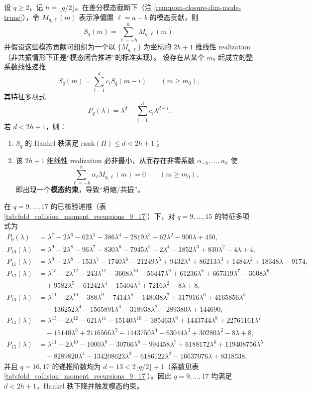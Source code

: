 \begin{theorem}\label{thm:pom-moment-resonance}
设 \(q\ge 2\)，记 \(h=\lfloor q/2\rfloor\)。在差分模态截断下（注 \ref{rem:pom-closure-dim-mode-trunc}），令 \(M_{q,\ell}(m)\) 表示净偏置 \(\ell=a-b\) 的模态贡献，则
$$
S_q(m)=\sum_{\ell=-h}^{h} M_{q,\ell}(m).
$$
并假设这些模态贡献可组织为一个以 \(\{M_{q,\ell}\}\) 为坐标的 \(2h+1\) 维线性 realization（非共振情形下正是“模态闭合推进”的标准实现）。
设存在从某个 \(m_0\) 起成立的整系数线性递推
$$
S_q(m)=\sum_{i=1}^{d} c_i S_q(m-i)\qquad(m\ge m_0),
$$
其特征多项式
$$
P_q(\lambda)=\lambda^d-\sum_{i=1}^d c_i\lambda^{d-i}.
$$
若 \(d<2h+1\)，则：
\begin{enumerate}
  \item \(S_q\) 的 Hankel 秩满足 \(\mathrm{rank}(H)\le d<2h+1\)；
  \item 该 \(2h+1\) 维线性 realization 必非最小，从而存在非零系数 \(\alpha_{-h},\dots,\alpha_h\) 使
  $$
  \sum_{\ell=-h}^{h}\alpha_\ell M_{q,\ell}(m)=0\qquad(m\ge m_0),
  $$
  即出现一个\textbf{模态约束}，导致“坍缩/共振”。
\end{enumerate}
在 \(q=9,\dots,17\) 的已核验递推（表 \ref{tab:fold_collision_moment_recursions_9_17}）下，对 \(q=9,\dots,15\) 的特征多项式为
$$
\begin{aligned}
P_9(\lambda)&=\lambda^7-2\lambda^6-62\lambda^5-386\lambda^4-2819\lambda^3-62\lambda^2-900\lambda+450,\\
P_{10}(\lambda)&=\lambda^9-2\lambda^8-96\lambda^7-830\lambda^6-7945\lambda^5-2\lambda^4-1852\lambda^3+830\lambda^2-4\lambda+4,\\
P_{11}(\lambda)&=\lambda^9-2\lambda^8-153\lambda^7-1740\lambda^6-21249\lambda^5+9432\lambda^4+86213\lambda^3+1484\lambda^2+18348\lambda-9174,
\\
P_{12}(\lambda)&=\lambda^{13}-2\lambda^{12}-243\lambda^{11}-3608\lambda^{10}-56447\lambda^9+61236\lambda^8+667319\lambda^7-3608\lambda^6\\
&\quad+9582\lambda^5-61242\lambda^4-15404\lambda^3+7216\lambda^2-8\lambda+8,\\
P_{13}(\lambda)&=\lambda^{11}-2\lambda^{10}-388\lambda^9-7414\lambda^8-148038\lambda^7+317916\lambda^6+4165856\lambda^5\\
&\quad-136252\lambda^4-1565891\lambda^3-318938\lambda^2-289380\lambda+144690,\\
P_{14}(\lambda)&=\lambda^{13}-2\lambda^{12}-621\lambda^{11}-15140\lambda^{10}-385463\lambda^9+1443744\lambda^8+22761161\lambda^7\\
&\quad-15140\lambda^6+2116566\lambda^5-1443750\lambda^4-63044\lambda^3+30280\lambda^2-8\lambda+8,\\
P_{15}(\lambda)&=\lambda^{11}-2\lambda^{10}-1000\lambda^9-30766\lambda^8-994458\lambda^7+6188172\lambda^6+119408756\lambda^5\\
&\quad-8289820\lambda^4-134208623\lambda^3-6186122\lambda^2-16637076\lambda+8318538,
\end{aligned}
$$
并且 \(q=16,17\) 的递推阶数均为 \(d=13<2\lfloor q/2\rfloor+1\)（系数见表 \ref{tab:fold_collision_moment_recursions_9_17}）。因此 \(q=9,\dots,17\) 均满足 \(d<2h+1\)，Hankel 秩下降并触发模态约束。
\end{theorem}
